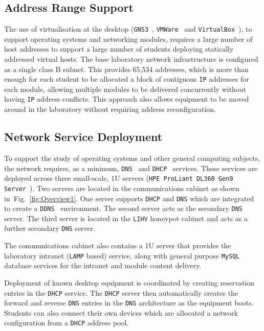 \documentclass{ieeeaccess}
\begin{document}
\subsection{Address Range Support}

The use of virtualisation at the desktop (\texttt{GNS3}~\cite{GNS3:17},
\texttt{VMWare}~\cite{VMWARE:17} and \texttt{VirtualBox}~\cite{O:17}), to support operating
systems and networking modules, requires a large number of host addresses to
support a large number of students deploying statically addressed virtual
hosts. The base laboratory network infrastructure is configured as a single
class B subnet.  This provides 65,534 addresses, which is more than enough for
each student to be allocated a block of contiguous \texttt{IP} addresses for
each module, allowing multiple modules to be delivered concurrently without
having \texttt{IP} address conflicts.  This approach also allows equipment to
be moved around in the laboratory without requiring address reconfiguration.

\subsection{Network Service Deployment}\label{InfraService}

To support the study of operating systems and other general computing subjects,
the network requires, as a minimum, \texttt{DNS}~\cite{RA:11} and
\texttt{DHCP}~\cite{DL:02} services. These services are deployed across three
small-scale, 1U servers (\texttt{HPE ProLiant DL360 Gen9 Server}~\cite{HPE:17}). Two
servers are located in the communications cabinet as shown
in~Fig.~\ref{fig:Overview1}. One server supports \texttt{DHCP} and \texttt{DNS}
which are integrated to create a \texttt{DDNS}~\cite{SV:06} environment. The
second server acts as the secondary \texttt{DNS} server. The third server is
located in the \texttt{LIHV} honeypot cabinet and acts as a further secondary
\texttt{DNS} server.

The communications cabinet also contains a 1U server that provides the
laboratory intranet (\texttt{LAMP} based) service, along with general purpose
\texttt{MySQL} database services for the intranet and module content delivery.

Deployment of known desktop equipment is coordinated by creating reservation
entries in the \texttt{DHCP} service. The \texttt{DHCP} server then
automatically creates the forward and reverse \texttt{DNS} entries in the
\texttt{DNS} architecture as the equipment boots. Students can also connect
their own devices which are allocated a network configuration from a
\texttt{DHCP} address pool.
\end{document}
